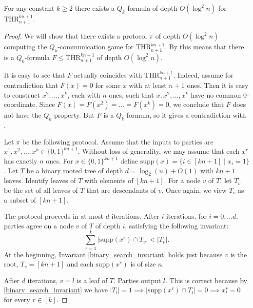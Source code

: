 \documentclass{toc}
\def\THR{\mathrm{THR}}
\begin{document}
\begin{corollary}
\label{weak}
For any constant $k \ge 2$ there exists 
%
a $Q_k$-formula of depth $O(\log^2 n)$  %
for $\THR^{kn + 1}_{n + 1}$.
\end{corollary}
\begin{proof}
We will show that there exists 
%
a protocol $\pi$ of depth $O(\log^2 n)$  %
computing the  $Q_k$-communication game for $\THR^{kn + 1}_{n + 1}$. By  this means that there is 
%
%
a $Q_k$-formula $F\le \THR^{kn + 1}_{n + 1}$
of depth $O(\log^2 n)$.   %

It is easy to see that $F$ actually coincides with $\THR^{kn + 1}_{n + 1}$. Indeed, assume for contradiction that $F(x) = 0$ for some $x$ with at least $n + 1$ ones. Then it is easy to construct $x^2, \ldots, x^k$, each with $n$ ones, such that $x, x^2, \ldots, x^k$ have no common $0$-coordinate. Since $F(x) = F(x^2) = \ldots = F(x^k) = 0$, we conclude that $F$ does not have the $Q_k$-property. But $F$ is a $Q_k$-formula, so  it gives a contradiction with .




Let $\pi$ be the following protocol. Assume that the inputs to parties are $x^1, x^2, \ldots, x^k \in \{0, 1\}^{kn + 1}$. Without loss of generality, we may assume that each $x^r$ has exactly $n$ ones. For $x\in\{0, 1\}^{kn + 1}$ define $\mathrm{supp}(x) = \{i \in [kn + 1] \mid x_i = 1\}$. Let $T$ be a binary rooted tree of depth $d = \log_2(n) + O(1)$ with $kn + 1$ leaves. Identify leaves of $T$ with elements of $[kn + 1]$. For a node $v$ of $T$, let $T_v$ be the set of all leaves of $T$ that are descendants of $v$. Once again, we view $T_v$ as a subset of $[kn + 1]$.

The protocol proceeds in at most $d$ iterations. After $i$ iterations, for $i = 0, \ldots d$, parties agree on a node $v$ of $T$ of depth $i$, satisfying the following invariant:
\begin{equation}
\label{binary_search_invariant}
\sum\limits_{r = 1}^k \left|\mathrm{supp}(x^r) \cap T_v\right| < |T_v|. 
\end{equation}
At the beginning, Invariant \eqref{binary_search_invariant} holds just because $v$ is the root, $T_v = [kn + 1]$ and each $\mathrm{supp}(x^r)$ is of size  $n$. 

After $d$ iterations, $v = l$ is a leaf of $T$. Parties output $l$. This is correct because by \eqref{binary_search_invariant} we have $|T_l| = 1 \implies  |\mathrm{supp}(x^r) \cap T_l| = 0 \implies x_l^r = 0$ for every $r\in [k]$. 


\end{proof}
\end{document}
